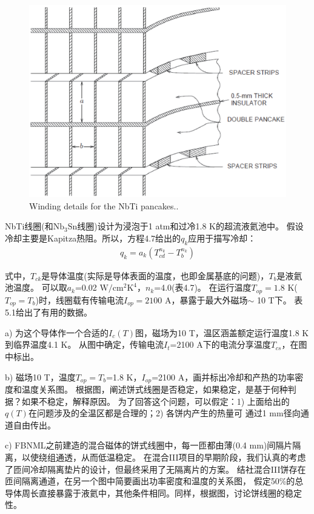 \begin{figure}[htbp]
	\centering
	\includegraphics[scale=0.6]{chpt6/figs/fig6.17.eps}
	\caption{Winding details for the NbTi pancakes..}
\end{figure}

NbTi线圈(和$\mathrm{Nb_3 Sn}$线圈)设计为浸泡于1 atm和过冷1.8 K的超流液氦池中。
假设冷却主要是Kapitza热阻。所以，方程4.7给出的$q_k$应用于描写冷却：
\begin{align*}%
q_k=a_k(T^{n_k}_{cd}-T^{n_k}_b) \tag{4.7}
\end{align*}

式中，$T_{ck}$是导体温度(实际是导体表面的温度，也即金属基底的问题)，$T_b$是液氦池温度。
可以取$a_k$=0.02 $\mathrm{W/cm^2 K^4}$，$n_k$=4.0(表4.7)。
在运行温度$T_{op}=1.8$ K($T_{op}=T_b$)时，线圈载有传输电流$I_{op}=2100$ A，暴露于最大外磁场$\sim$ 10 T下。
表5.1给出了有用的数据。

a) 为这个导体作一个合适的$I_c(T)$图，磁场为10 T，温区涵盖额定运行温度1.8 K到临界温度4.1 K。
从图中确定，传输电流$I_t$=2100 A下的电流分享温度$T_{cs}$，在图中标出。

b) 磁场10 T，温度$T_{op}=T_b$=1.8 K，$I_{op}$=2100 A，画并标出冷却和产热的功率密度和温度关系图。
根据图，阐述饼式线圈是否稳定，如果稳定，是基于何种判据？如果不稳定，解释原因。
为了回答这个问题，可以假定：1) 上面给出的$q(T)$在问题涉及的全温区都是合理的；2) 各饼内产生的热量可
通过1 mm径向通道自由传出。

c) FBNML之前建造的混合磁体的饼式线圈中，每一匝都由薄(0.4 mm)间隔片隔离，以使绕组通透，从而低温稳定。
在混合III项目的早期阶段，我们认真的考虑了匝间冷却隔离垫片的设计，但最终采用了无隔离片的方案。
结社混合III饼存在匝间隔离通道，在另一个图中简要画出功率密度和温度的关系图，
假定50\%的总导体周长直接暴露于液氦中，其他条件相同。同样，根据图，讨论饼线圈的稳定性。


